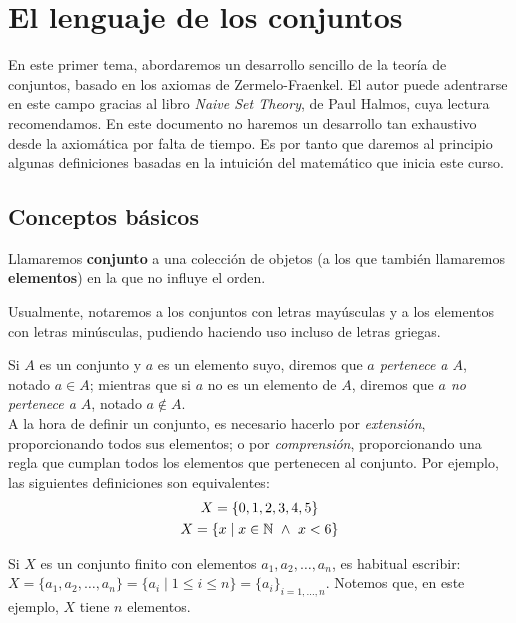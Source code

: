 \chapter{El lenguaje de los conjuntos}
En este primer tema, abordaremos un desarrollo sencillo de la teoría de conjuntos, basado en los axiomas de Zermelo-Fraenkel. El autor puede adentrarse en este campo gracias al libro \emph{Naive Set Theory}, de Paul Halmos, cuya lectura recomendamos. En este documento no haremos un desarrollo tan exhaustivo desde la axiomática por falta de tiempo. Es por tanto que daremos al principio algunas definiciones basadas en la intuición del matemático que inicia este curso.

\section{Conceptos básicos}

\begin{definicion}[Conjunto]
    Llamaremos \textbf{conjunto} a una colección de objetos (a los que también llamaremos \textbf{elementos})
    en la que no influye el orden.
\end{definicion}
\begin{notacion}
    Usualmente, notaremos a los conjuntos con letras mayúsculas y a los elementos con letras minúsculas, pudiendo haciendo uso incluso de letras griegas.
\end{notacion}

Si $A$ es un conjunto y $a$ es un elemento suyo, diremos que \textit{$a$ pertenece a $A$}, notado $a \in A$; mientras que si $a$ no es un elemento de $A$, diremos que \textit{$a$ no pertenece a $A$}, notado $a \notin A$.\\

A la hora de definir un conjunto, es necesario hacerlo por \textit{extensión}, proporcionando todos sus elementos; o por \textit{comprensión}, proporcionando una regla que cumplan todos los elementos que pertenecen al conjunto. Por ejemplo, las siguientes definiciones son equivalentes:
\begin{gather*}
    X = \{0, 1, 2, 3, 4, 5\} \\
    X = \{x \mid x \in \mathbb N \ \land \  x < 6\}
\end{gather*}

Si $X$ es un conjunto finito con elementos $a_1, a_2, \ldots, a_n$, es habitual escribir: $X = \{a_1, a_2, \ldots, a_n\} = \{a_i \mid 1 \leq i \leq n\} = \{a_i\}_{i = 1, \ldots, n}$. Notemos que, en este ejemplo, $X$ tiene $n$ elementos.

